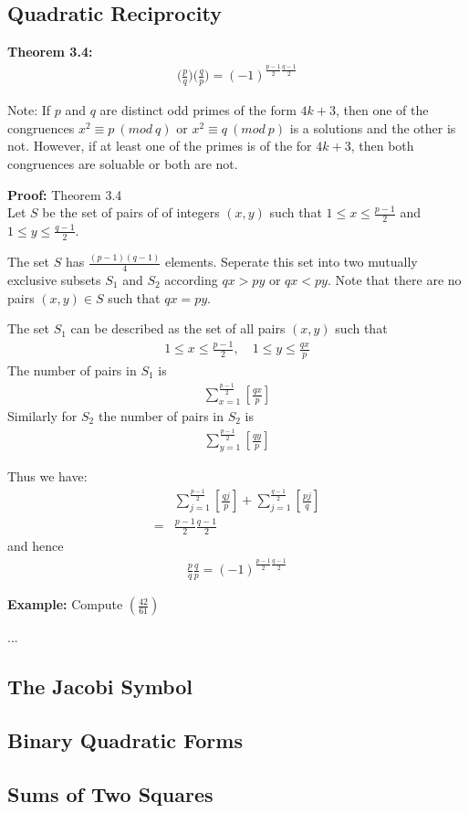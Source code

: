 \documentclass[a4paper]{article}
\begin{document}
\subsection{Quadratic Reciprocity}


\textbf{Theorem 3.4:}\\

\begin{align}
    \bigg(\frac{p}{q}\bigg)\bigg(\frac{q}{p}\bigg)=(-1)^{\frac{p-1}{2}\frac{q-1}{2}}
\end{align}

Note: If $p$ and $q$ are distinct odd primes of the form $4k+3$, then one of the congruences $x^2\equiv p\ (mod\ q)$ or $x^2\equiv q\ (mod\ p)$ is a solutions and the other is not. However, if at least one of the primes is of the for $4k+3$, then both congruences are soluable or both are not.

\textbf{Proof:} Theorem 3.4\\
Let $S$ be the set of pairs of of integers $(x,y)$ such that $1\leq x\leq\frac{p-1}{2}$ and $1\leq y\leq\frac{q-1}{2}$.

The set $S$ has $\frac{(p-1)(q-1)}{4}$ elements. Seperate this set into two mutually exclusive subsets $S_1$ and $S_2$ according $qx>py$ or $qx<py$. Note that there are no pairs $(x,y)\in S$ such that $qx=py$.

The set $S_1$ can be described as the set of all pairs $(x,y)$ such that
\begin{align}
    1\leq x\leq\frac{p-1}{2},\quad 1\leq y\leq\frac{qx}{p}
\end{align}
The number of pairs in $S_1$ is
\begin{align}
    \sum^\frac{p-1}{2}_{x=1}[\frac{qx}{p}]
\end{align}
Similarly for $S_2$ the number of pairs in $S_2$ is
\begin{align}
    \sum^\frac{p-1}{2}_{y=1}[\frac{qy}{p}]
\end{align}

Thus we have:
\begin{align}
     &\sum^{\frac{p-1}{2}}_{j=1}[\frac{qj}{p}]+\sum^{\frac{q-1}{2}}_{j=1}[\frac{pj}{q}]\\
    =&\frac{p-1}{2}\frac{q-1}{2}
\end{align}
and hence
\begin{align}
    \frac{p}{q}\frac{q}{p}=(-1)^{\frac{p-1}{2}\frac{q-1}{2}}
\end{align}

\textbf{Example:} Compute $(\frac{42}{61})$

...

\subsection{The Jacobi Symbol}


\subsection{Binary Quadratic Forms}

\subsection{Sums of Two Squares}
\end{document}
